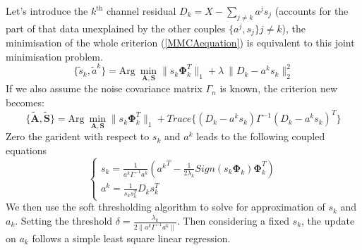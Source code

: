 Let's introduce the $k^{\text{th}}$ channel residual $D_k = X - \sum_{j \neq k}a^j s_{j}$ (accounts for the part of that data unexplained by the other couples $\{a^j, s_j\}j \neq k$), the minimisation of the whole criterion (\ref{MMCAequation}) is equivalent to this joint minimisation problem.
\begin{equation}
    \{\tilde{s}_k, \tilde{a}^k\} = \text{Arg} \: \min_{\mathbf{A},\mathbf{S}} \lVert s_k \mathbf{\Phi}_k^T \rVert_{1} + \lambda \:\lVert D_k - a^ks_k \rVert^2_2
    \label{MMCAequation2}
\end{equation}
If we also assume the noise covariance matrix $\Gamma_n$ is known, the criterion new becomes:
\begin{equation}
    \{\mathbf{\tilde{A},\tilde{S}}\} = \text{Arg} \: \min_{\mathbf{A},\mathbf{S}} \lVert s_k \mathbf{\Phi}_k^T \rVert_{1} + Trace \{ (D_k - a^ks_k)\Gamma^{-1}(D_k - a^ks_k)^T\}
    \label{MMCAequation3}
\end{equation}
Zero the garident with respect to $s_k$ and $a^k$ leads to the following coupled equations
\begin{equation}
    \begin{cases}
       s_k = \frac{1}{a^k\Gamma^{-1}a^k}({a^k}^T - \frac{1}{2\lambda_k} Sign(s_k \mathbf{\Phi}_k) \mathbf{\Phi}_k^T)\\
       a^k = \frac{1}{s_ks_k^T}D_k s_k^T
    \end{cases}
\end{equation}
We then use the soft thresholding algorithm to solve for approximation of $s_k$ and $a_k$. Setting the threshold $\delta = \frac{\lambda_k}{2\lVert a^k\Gamma^{-1}a^k \rVert}$. Then considering a fixed $s_k$, the update on $a_k$ follows a simple least square linear regression.

